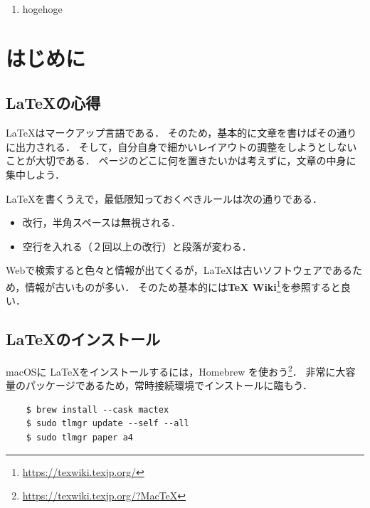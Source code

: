 \documentclass[12pt,twoside]{jsbook}
\begin{document}
\listoffigures         %
\listoftables          %

\ownpaper              %

\begin{enumerate}
\item hogehoge
\end{enumerate}



%
%
\chapter{はじめに}

\section{\LaTeX の心得}

\LaTeX はマークアップ言語である．
そのため，基本的に文章を書けばその通りに出力される．
そして，自分自身で細かいレイアウトの調整をしようとしないことが大切である．
ページのどこに何を置きたいかは考えずに，文章の中身に集中しよう．

\LaTeX を書くうえで，最低限知っておくべきルールは次の通りである．

\begin{itemize}
    \item 改行，半角スペースは無視される．
    \item 空行を入れる（２回以上の改行）と段落が変わる．
\end{itemize}

Webで検索すると色々と情報が出てくるが，\LaTeX は古いソフトウェアであるため，情報が古いものが多い．
そのため基本的には\textbf{TeX Wiki}\footnote{\url{https://texwiki.texjp.org/}}を参照すると良い．


\section{\LaTeX のインストール}

macOSに \LaTeX をインストールするには，Homebrew を使おう\footnote{\url{https://texwiki.texjp.org/?MacTeX}}．
非常に大容量のパッケージであるため，常時接続環境でインストールに臨もう．

\begin{verbatim}
    $ brew install --cask mactex
    $ sudo tlmgr update --self --all
    $ sudo tlmgr paper a4
\end{verbatim}
\end{document}
